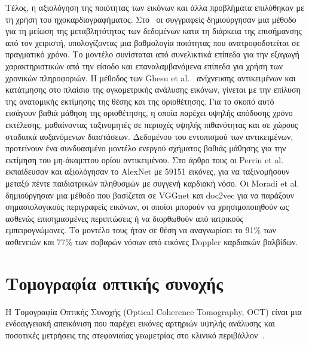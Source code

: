 Τέλος, η αξιολόγηση της ποιότητας των εικόνων και άλλα προβλήματα επιλύθηκαν με τη χρήση του ηχοκαρδιογραφήματος.
Στο~\cite{abdi2017quality} οι συγγραφείς δημιούργησαν μια μέθοδο για τη μείωση της μεταβλητότητας των δεδομένων κατα τη διάρκεια της επισήμανσης από τον χειριστή, υπολογίζοντας μια βαθμολογία ποιότητας που ανατροφοδοτείται σε πραγματικό χρόνο.
Το μοντέλο συνίσταται από συνελικτικά επίπεδα για την εξαγωγή χαρακτηριστικών από την είσοδο και επαναλαμβανόμενα επίπεδα για χρήση των χρονικών πληροφοριών.
Η μέθοδος των Ghesu et al.~\cite{ghesu2016marginal} ανίχνευσης αντικειμένων και κατάτμησης στο πλαίσιο της ογκομετρικής ανάλυσης εικόνων, γίνεται με την επίλυση της ανατομικής εκτίμησης της θέσης και της οριοθέτησης.
Για το σκοπό αυτό εισάγουν βαθιά μάθηση της οριοθέτησης, η οποία παρέχει υψηλής απόδοσης χρόνο εκτέλεσης, μαθαίνοντας ταξινομητές σε περιοχές υψηλής πιθανότητας και σε χώρους σταδιακά αυξανόμενων διαστάσεων.
Δεδομένου του εντοπισμού των αντικειμένων, προτείνουν ένα συνδυασμένο μοντέλο ενεργού σχήματος βαθιάς μάθησης για την εκτίμηση του μη-άκαμπτου ορίου αντικειμένου.
Στο άρθρο τους οι Perrin et al.~\cite{perrin2017application} εκπαίδευσαν και αξιολόγησαν το AlexNet με 59151 εικόνες, για να ταξινομήσουν μεταξύ πέντε παιδιατρικών πληθυσμών με συγγενή καρδιακή νόσο.
Οι Moradi et al.~\cite{moradi2016cross} δημιούργησαν μια μέθοδο που βασίζεται σε VGGnet και doc2vec για να παράξουν σημασιολογικούς περιγραφείς εικόνων, οι οποίοι μπορούν να χρησιμοποιηθούν ως ασθενώς επισημασμένες περιπτώσεις ή να διορθωθούν από ιατρικούς εμπειρογνώμονες.
Το μοντέλο τους ήταν σε θέση να αναγνωρίσει το 91\% των ασθενειών και 77\% των σοβαρών νόσων από εικόνες Doppler καρδιακών βαλβίδων.

\section{Τομογραφία οπτικής συνοχής}
Η Τομογραφία Οπτικής Συνοχής (Optical Coherence Tomography, OCT) είναι μια ενδοαγγειακή απεικόνιση που παρέχει εικόνες αρτηριών υψηλής ανάλυσης και ποσοτικές μετρήσεις της στεφανιαίας γεωμετρίας στο κλινικό περιβάλλον~\cite{kubo2013oct}.

